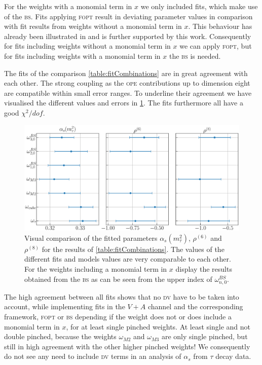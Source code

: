 \documentclass[../../index.tex]{subfiles}
\begin{document}
For the weights with a monomial term in \(x\) we only included fits, which make
use of the \textsc{bs}. Fits applying \textsc{fopt} result in deviating
parameter values in comparison with fit results from weights without a monomial
term in \(x\). This behaviour has already been illustrated in \cite{Beneke2012}
and is further supported by this work. Consequently for fits including weights
without a monomial term in \(x\) we can apply \textsc{fopt}, but for fits
including weights with a monomial term in \(x\) the \textsc{bs} is needed.

The fits of the comparison \cref{table:fitCombinations} are in great agreement
with each other. The strong coupling as the \textsc{ope} contributions up to
dimension eight are compatible within small error ranges. To underline their
agreement we have visualised the different values and errors in
\cref{fig:comparisonAlC6C8}. The fits furthermore all have a good
\(\chi^2/dof\).
\begin{figure}
  \centering \includegraphics[width=\textwidth]{./images/comparisonAlC6C8.eps}
  \caption{Visual comparison of the fitted parameters \(\alpha_s(m_\tau^2)\),
    \(\rho^{(6)}\) and \(\rho^{(8)}\) for the results of
    \cref{table:fitCombinations}. The values of the different fits and models
    values are very comparable to each other. For the weights including a
    monomial term in \(x\) display the results obtained from the \textsc{bs} as
    can be seen from the upper index of \(\omega_{n,0}^{BS}\).}
  \label{fig:comparisonAlC6C8}
\end{figure}

The high agreement between all fits shows that no \textsc{dv} have to be taken
into account, while implementing fits in the \(V+A\) channel and the
corresponding framework, \textsc{fopt} or \textsc{bs} depending if the weight
does not or does include a monomial term in \(x\), for at least single pinched
weights. At least single and not double pinched, because the weights
\(\omega_{M2}\) and \(\omega_{M3}\) are only single pinched, but still in high
agreement with the other higher pinched weights! We consequently do not see any
need to include \textsc{dv} terms in an analysis of \(\alpha_s\) from
\(\tau\) decay data.
\end{document}
